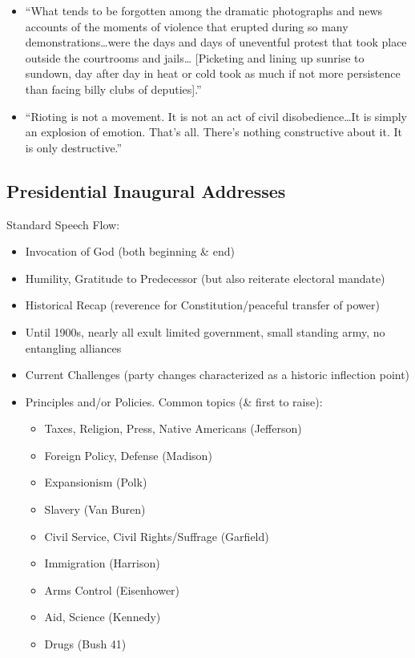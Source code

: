 \documentclass[
]{article}
\begin{document}
\begin{itemize}
\item
  ``What tends to be forgotten among the dramatic photographs and news
  accounts of the moments of violence that erupted during so many
  demonstrations\ldots were the days and days of uneventful protest that
  took place outside the courtrooms and jails\ldots{} {[}Picketing and
  lining up sunrise to sundown, day after day in heat or cold took as
  much if not more persistence than facing billy clubs of deputies{]}.''
\item
  ``Rioting is not a movement. It is not an act of civil
  disobedience\ldots It is simply an explosion of emotion. That's all.
  There's nothing constructive about it. It is only destructive.''
\end{itemize}

\hypertarget{presidential-inaugural-addresses}{%
\subsection{Presidential Inaugural
Addresses}\label{presidential-inaugural-addresses}}

Standard Speech Flow:

\begin{itemize}
\item
  Invocation of God (both beginning \& end)
\item
  Humility, Gratitude to Predecessor (but also reiterate electoral
  mandate)
\item
  Historical Recap (reverence for Constitution/peaceful transfer of
  power)
\item
  Until 1900s, nearly all exult limited government, small standing army,
  no entangling alliances
\item
  Current Challenges (party changes characterized as a historic
  inflection point)
\item
  Principles and/or Policies. Common topics (\& first to raise):

  \begin{itemize}
  \item
    Taxes, Religion, Press, Native Americans (Jefferson)
  \item
    Foreign Policy, Defense (Madison)
  \item
    Expansionism (Polk)
  \item
    Slavery (Van Buren)
  \item
    Civil Service, Civil Rights/Suffrage (Garfield)
  \item
    Immigration (Harrison)
  \item
    Arms Control (Eisenhower)
  \item
    Aid, Science (Kennedy)
  \item
    Drugs (Bush 41)
  \end{itemize}
\end{itemize}
\end{document}
